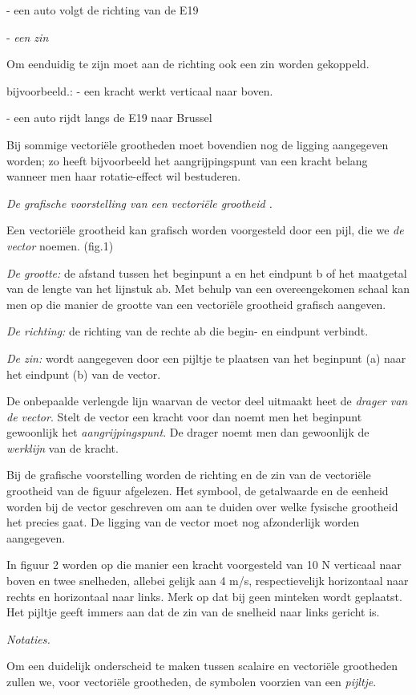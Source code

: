 \documentclass[]{article}
\begin{document}
- een auto volgt de richting van de E19

- \emph{een zin}

Om eenduidig te zijn moet aan de richting ook een zin worden gekoppeld.

bijvoorbeeld.: - een kracht werkt verticaal naar boven.

- een auto rijdt langs de E19 naar Brussel

Bij sommige vectoriële grootheden moet bovendien nog de ligging
aangegeven worden; zo heeft bijvoorbeeld het aangrijpingspunt van een
kracht belang wanneer men haar rotatie-effect wil bestuderen.

\emph{De grafische voorstelling van een vectoriële grootheid .}

Een vectoriële grootheid kan grafisch worden voorgesteld door een pijl,
die we \emph{de vector} noemen. (fig.1)

\emph{De grootte:} de afstand tussen het beginpunt a en het eindpunt b
of het maatgetal van de lengte van het lijnstuk ab. Met behulp van een
overeengekomen schaal kan men op die manier de grootte van een
vectoriële grootheid grafisch aangeven.

\emph{De richting:} de richting van de rechte ab die begin- en eindpunt
verbindt.

\emph{De zin:} wordt aangegeven door een pijltje te plaatsen van het
beginpunt (a) naar het eindpunt (b) van de vector.

De onbepaalde verlengde lijn waarvan de vector deel uitmaakt heet de
\emph{drager van de vector}. Stelt de vector een kracht voor dan noemt
men het beginpunt gewoonlijk het \emph{aangrijpingspunt}. De drager
noemt men dan gewoonlijk de \emph{werklijn} van de kracht.

Bij de grafische voorstelling worden de richting en de zin van de
vectoriële grootheid van de figuur afgelezen. Het symbool, de
getalwaarde en de eenheid worden bij de vector geschreven om aan te
duiden over welke fysische grootheid het precies gaat. De ligging van de
vector moet nog afzonderlijk worden aangegeven.

In figuur 2 worden op die manier een kracht voorgesteld van 10 N
verticaal naar boven en twee snelheden, allebei gelijk aan 4 m/s,
respectievelijk horizontaal naar rechts en horizontaal naar links. Merk
op dat bij geen minteken wordt geplaatst. Het pijltje geeft immers aan
dat de zin van de snelheid naar links gericht is.

\emph{Notaties.}

Om een duidelijk onderscheid te maken tussen scalaire en vectoriële
grootheden zullen we, voor vectoriële grootheden, de symbolen voorzien
van een \emph{pijltje}.
\end{document}

